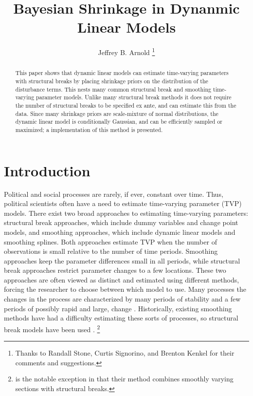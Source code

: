 \documentclass{article}
\author{Jeffrey B. Arnold%
\thanks{Thanks to Randall Stone, Curtis Signorino, and Brenton Kenkel for their comments and suggestions.}
}
\title{Bayesian Shrinkage in Dynanmic Linear Models}
\begin{document}
\maketitle{}

\begin{abstract}
  This paper shows that dynamic linear models can estimate time-varying parameters with structural breaks by placing shrinkage priors on the distribution of the disturbance terms. 
  This nests many common structural break and smoothing time-varying parameter models.
  Unlike many structural break methods it does not require the number of structural breaks to be specified ex ante, and can estimate this from the data.
  Since many shrinkage priors are scale-mixture of normal distributions, the dynamic linear model is conditionally Gaussian, and can be efficiently sampled or maximized; 
  a \Stan{} implementation of this method is presented.
\end{abstract}

\section{Introduction}
\label{sec:introduction}

Political and social processes are rarely, if ever, constant over time.
Thus, political scientists often have a need to estimate time-varying parameter (TVP) models.
There exist two broad approaches to estimating time-varying parameters: structural break approaches, which include dummy variables and change point models, and smoothing approaches, which include dynamic linear models and smoothing splines.
Both approaches estimate TVP when the number of observations is small relative to the number of time periods. 
Smoothing approaches keep the parameter differences small in all periods, while structural break approaches restrict parameter changes to a few locations.
These two approaches are often viewed as distinct and estimated using different methods, forcing the researcher to choose between which model to use.
Many processes the changes in the process are characterized by many periods of stability and a few periods of possibly rapid and large, change \parencite{RatkovicEng2010}.
Historically, existing smoothing methods have had a difficulty estimating these sorts of processes, so structural break models have been used \parencites{CalderiaZorn1998}{Spirling2007a}{Spirling2007b}{Park2010}{Park2011}.%
\footnote{\textcite{RatkovicEng2010} is the notable exception in that their method combines smoothly varying sections with structural breaks.}
\end{document}
